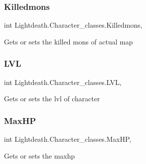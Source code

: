\subsubsection{\texorpdfstring{Killedmons}{Killedmons}}
{\footnotesize\ttfamily int Lightdeath.\+Character\+\_\+classes.\+Killedmons\hspace{0.3cm}{\ttfamily [get]}, {\ttfamily [set]}}



Gets or sets the killed mons of actual map 

\hypertarget{class_lightdeath_1_1_character__classes_aedb9c7cf2519076a0e507ca69608a617}{}\label{class_lightdeath_1_1_character__classes_aedb9c7cf2519076a0e507ca69608a617} 
\subsubsection{\texorpdfstring{L\+VL}{LVL}}
{\footnotesize\ttfamily int Lightdeath.\+Character\+\_\+classes.\+L\+VL\hspace{0.3cm}{\ttfamily [get]}, {\ttfamily [set]}}



Gets or sets the lvl of character 

\hypertarget{class_lightdeath_1_1_character__classes_acd36193ea83be482c414822fc2fe47e3}{}\label{class_lightdeath_1_1_character__classes_acd36193ea83be482c414822fc2fe47e3} 
\subsubsection{\texorpdfstring{Max\+HP}{MaxHP}}
{\footnotesize\ttfamily int Lightdeath.\+Character\+\_\+classes.\+Max\+HP\hspace{0.3cm}{\ttfamily [get]}, {\ttfamily [set]}}



Gets or sets the maxhp 

\hypertarget{class_lightdeath_1_1_character__classes_acdb8976da184c7f6e2883b8a3f53b750}{}\label{class_lightdeath_1_1_character__classes_acdb8976da184c7f6e2883b8a3f53b750} 
